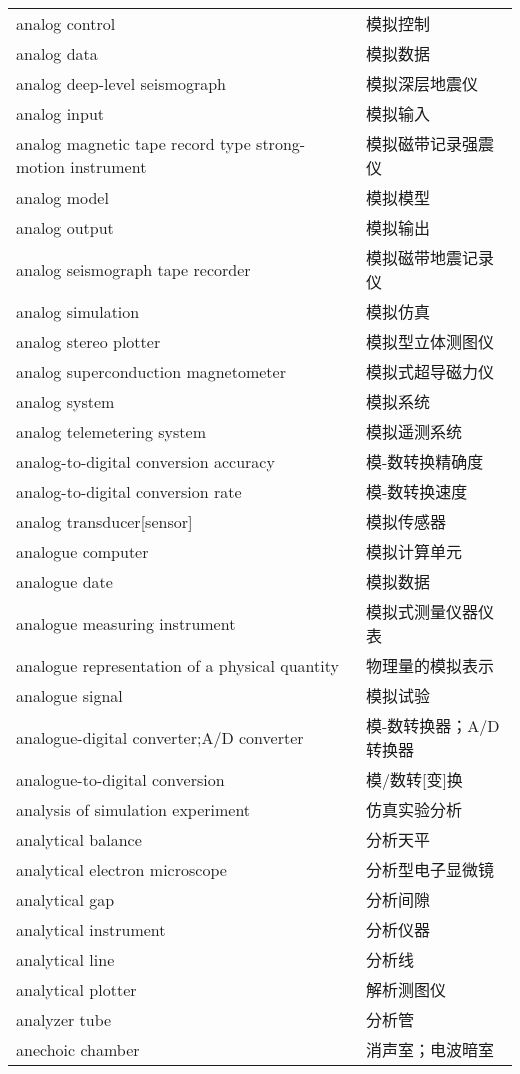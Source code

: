 \documentclass[
]{article}
\begin{document}
\begin{longtable}[]{@{}ll@{}}
analog control & 模拟控制 \\
analog data & 模拟数据 \\
analog deep-level seismograph & 模拟深层地震仪 \\
analog input & 模拟输入 \\
analog magnetic tape record type strong-motion instrument &
模拟磁带记录强震仪 \\
analog model & 模拟模型 \\
analog output & 模拟输出 \\
analog seismograph tape recorder & 模拟磁带地震记录仪 \\
analog simulation & 模拟仿真 \\
analog stereo plotter & 模拟型立体测图仪 \\
analog superconduction magnetometer & 模拟式超导磁力仪 \\
analog system & 模拟系统 \\
analog telemetering system & 模拟遥测系统 \\
analog-to-digital conversion accuracy & 模-数转换精确度 \\
analog-to-digital conversion rate & 模-数转换速度 \\
analog transducer{[}sensor{]} & 模拟传感器 \\
analogue computer & 模拟计算单元 \\
analogue date & 模拟数据 \\
analogue measuring instrument & 模拟式测量仪器仪表 \\
analogue representation of a physical quantity & 物理量的模拟表示 \\
analogue signal & 模拟试验 \\
analogue-digital converter;A/D converter & 模-数转换器；A/D转换器 \\
analogue-to-digital conversion & 模/数转{[}变{]}换 \\
analysis of simulation experiment & 仿真实验分析 \\
analytical balance & 分析天平 \\
analytical electron microscope & 分析型电子显微镜 \\
analytical gap & 分析间隙 \\
analytical instrument & 分析仪器 \\
analytical line & 分析线 \\
analytical plotter & 解析测图仪 \\
analyzer tube & 分析管 \\
anechoic chamber & 消声室；电波暗室 \\

\end{longtable}
\end{document}
